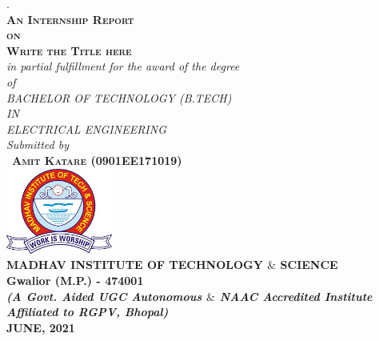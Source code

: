 \documentclass[12pt,openright,twoside]{report}
\makeatletter
\newif\if@abstractmode
\renewenvironment{titlepage}
{
  \if@twocolumn
  \@restonecoltrue\onecolumn
  \else
  \@restonecolfalse\newpage
  \fi
  \if@abstractmode
  \thispagestyle{plain}%
  \stepcounter{page}%
  \else
  \thispagestyle{empty}%
  \setcounter{page}\@ne%
  \fi
}%
{\if@restonecol\twocolumn \else \newpage \fi
  \if@twoside\else
  \if@abstractmode
  \else
  \setcounter{page}\@ne%
  \fi
  \fi
}
\makeatother
\begin{document}
\begin{titlepage}
\vspace{-500cm}

\center %
 
.\\[0.6cm]
\textsc{\Large \textbf{An Internship Report\\[0.80cm]on}}\\[0.80cm] %
\textsc{\Large \textbf{Write the Title here}}\\[0.80cm] %

{ \it in partial fulfillment for the award of the degree \\[0.80cm]of \\[0.80cm]

\large{BACHELOR OF TECHNOLOGY (B.TECH)\\[0.8cm]}{IN\\[0.8cm]ELECTRICAL ENGINEERING}\\[1.6cm] Submitted by}\\[0.8cm]
\
\textsc{\textbf{Amit Katare (0901EE171019)}} \\[1.60cm]


\includegraphics[width=3.5cm]{images.jpg}\\[0.80cm]
 
\textsc{\textbf{MADHAV INSTITUTE OF TECHNOLOGY $\&$ SCIENCE}}\\[0.15cm]\textbf{Gwalior (M.P.) - 474001}\\[0.15cm] \footnotesize{\it{\textbf{(A Govt. Aided UGC Autonomous $\&$ NAAC Accredited Institute Affiliated to RGPV, Bhopal)}}} \\[0.15cm] \textbf{JUNE, 2021}
\end{titlepage}
\clearpage
\end{document}
